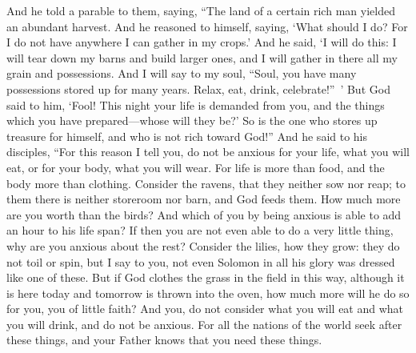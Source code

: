 \begin{biblechapter}
\verse And he told a parable to them, saying, “The land of a certain rich man yielded an abundant harvest.
\verse And he reasoned to himself, saying, ‘What should I do? For I do not have anywhere I can gather in my crops.’
\verse And he said, ‘I will do this: I will tear down my barns and build larger ones, and I will gather in there all my grain and possessions.
\verse And I will say to my soul, “Soul, you have many possessions stored up for many years. Relax, eat, drink, celebrate!” ’
\verse But God said to him, ‘Fool! This night your life is demanded from you, and the things which you have prepared—whose will they be?’
\verse So is the one who stores up treasure for himself, and who is not rich toward God!”
 And he said to his disciples, “For this reason I tell you, do not be anxious for your life, what you will eat, or for your body, what you will wear.
\verse For life is more than food, and the body more than clothing.
\verse Consider the ravens, that they neither sow nor reap; to them there is neither storeroom nor barn, and God feeds them. How much more are you worth than the birds?
\verse And which of you by being anxious is able to add an hour to his life span?
\verse If then you are not even able to do a very little thing, why are you anxious about the rest?
\verse Consider the lilies, how they grow: they do not toil or spin, but I say to you, not even Solomon in all his glory was dressed like one of these.
\verse But if God clothes the grass in the field in this way, although it is here today and tomorrow is thrown into the oven, how much more will he do so for you, you of little faith?
\verse And you, do not consider what you will eat and what you will drink, and do not be anxious.
\verse For all the nations of the world seek after these things, and your Father knows that you need these things.

\end{biblechapter}
